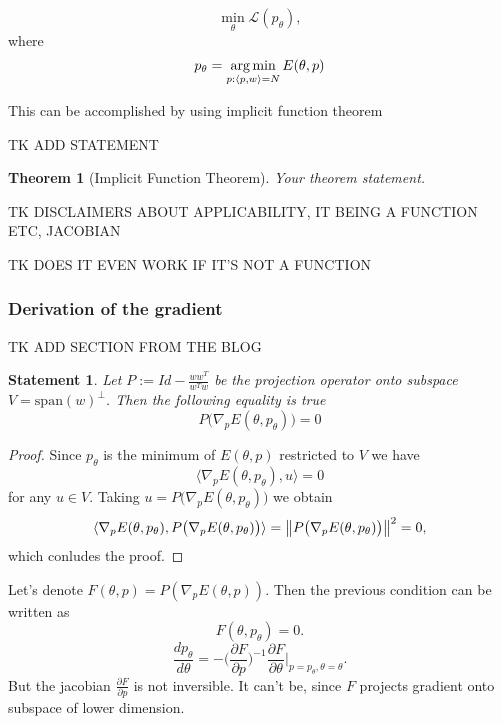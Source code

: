 \documentclass[a4paper,10pt]{report}
\newtheorem{theorem}{Theorem}
\newtheorem{statement}{Statement}
\begin{document}
\begin{equation}
 \min_\theta \mathcal{L}(p_\theta),
\end{equation}
where
\begin{equation}
 p_\theta = \operatorname*{arg\,min}_{p: \langle p, w \rangle=N} E(\theta, p)
\end{equation}

This can be accomplished by using implicit function theorem

TK ADD STATEMENT
\begin{theorem}[Implicit Function Theorem]
Your theorem statement.
\end{theorem}


TK DISCLAIMERS ABOUT APPLICABILITY, IT BEING A FUNCTION ETC, JACOBIAN

TK DOES IT EVEN WORK IF IT'S NOT A FUNCTION
\subsubsection{Derivation of the gradient}


TK ADD SECTION FROM THE BLOG
\begin{statement}
 Let $P := Id -\frac{ww^T}{w^Tw} $ be the projection operator onto subspace $V = \text{span}(w)^{\perp}$. Then the following equality is true
 \begin{equation}
  P\big(\nabla_p E(\theta, p_\theta)\big) = 0
 \end{equation}

\end{statement}

\begin{proof}
  Since $p_\theta$ is the minimum of $E(\theta,p)$ restricted to $V$ we have \[\langle \nabla_p E(\theta,p_{\theta}), u \rangle = 0\] for any $u\in V$. Taking $u = P\big( \nabla_p E(\theta,p_\theta)\big)$ we obtain
  \[\langle \nabla_p E(\theta,p_{\theta}), P\big( \nabla_p E(\theta,p_\theta)\big) \rangle = \left\|P\big( \nabla_p E(\theta,p_\theta)\big)\right\|^2=0,\]
  which conludes the proof.
\end{proof}

Let's denote $F(\theta,p) =P (\nabla_p E(\theta,p)).$ Then the previous condition can be written as
$$F(\theta,p_\theta) = 0.$$
$$\frac{d p_\theta}{d\theta} = - \bigg(\frac{\partial F}{\partial p}\bigg)^{-1}  \frac{\partial F}{\partial \theta}\bigg|_{p=p_\theta, \theta=\theta}.$$
But the jacobian $\frac{\partial F}{\partial p}$ is not inversible. It can't be, since $F$ projects gradient onto subspace of lower dimension.
\end{document}

